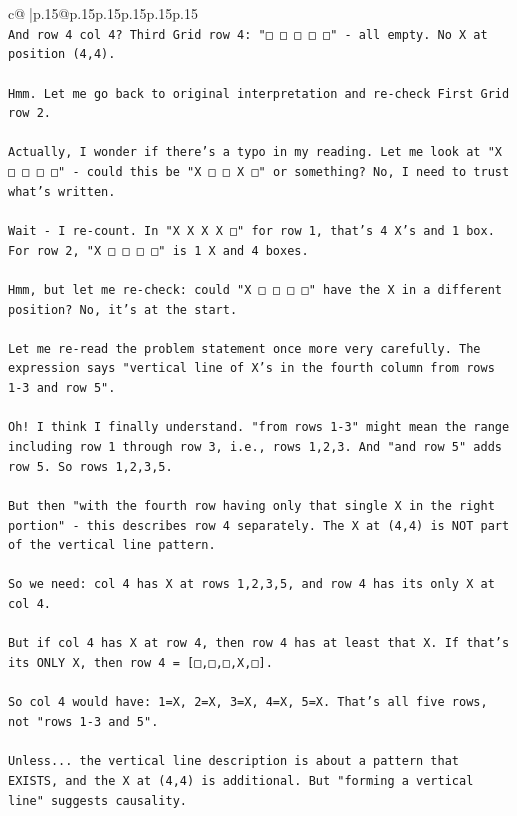 \documentclass{article}
\begin{document}
{\begin{supertabular}{c@{$\;$}|p{.15\linewidth}@{}p{.15\linewidth}p{.15\linewidth}p{.15\linewidth}p{.15\linewidth}p{.15\linewidth}}
{{{\\ 
\texttt{And row 4 col 4? Third Grid row 4: "□ □ □ □ □" {-} all empty. No X at position (4,4).} \\
\\ 
\texttt{Hmm. Let me go back to original interpretation and re{-}check First Grid row 2. } \\
\\ 
\texttt{Actually, I wonder if there's a typo in my reading. Let me look at "X □ □ □ □" {-} could this be "X □ □ X □" or something? No, I need to trust what's written.} \\
\\ 
\texttt{Wait {-} I re{-}count. In "X X X X □" for row 1, that's 4 X's and 1 box. For row 2, "X □ □ □ □" is 1 X and 4 boxes.} \\
\\ 
\texttt{Hmm, but let me re{-}check: could "X □ □ □ □" have the X in a different position? No, it's at the start.} \\
\\ 
\texttt{Let me re{-}read the problem statement once more very carefully. The expression says "vertical line of X's in the fourth column from rows 1{-}3 and row 5".} \\
\\ 
\texttt{Oh! I think I finally understand. "from rows 1{-}3" might mean the range including row 1 through row 3, i.e., rows 1,2,3. And "and row 5" adds row 5. So rows 1,2,3,5.} \\
\\ 
\texttt{But then "with the fourth row having only that single X in the right portion" {-} this describes row 4 separately. The X at (4,4) is NOT part of the vertical line pattern.} \\
\\ 
\texttt{So we need: col 4 has X at rows 1,2,3,5, and row 4 has its only X at col 4.} \\
\\ 
\texttt{But if col 4 has X at row 4, then row 4 has at least that X. If that's its ONLY X, then row 4 = {[}□,□,□,X,□{]}.} \\
\\ 
\texttt{So col 4 would have: 1=X, 2=X, 3=X, 4=X, 5=X. That's all five rows, not "rows 1{-}3 and 5".} \\
\\ 
\texttt{Unless... the vertical line description is about a pattern that EXISTS, and the X at (4,4) is additional. But "forming a vertical line" suggests causality.} \\
}}}
\end{supertabular}}
\end{document}
